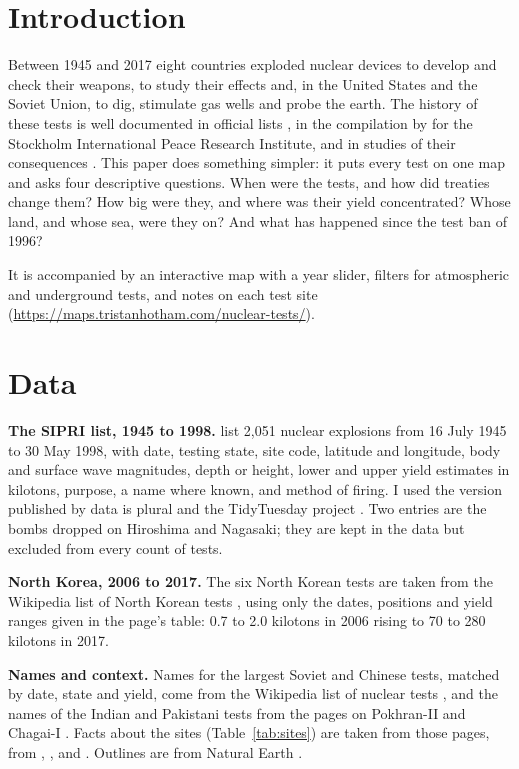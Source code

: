 \documentclass[11pt,a4paper]{article}
\begin{document}
\section{Introduction}
Between 1945 and 2017 eight countries exploded nuclear devices to develop and check their weapons, to study their effects and, in the United States and the Soviet Union, to dig, stimulate gas wells and probe the earth. The history of these tests is well documented in official lists \citep{doe,mikhailov}, in the compilation by \citet{sipri} for the Stockholm International Peace Research Institute, and in studies of their consequences \citep{unscear}. This paper does something simpler: it puts every test on one map and asks four descriptive questions. When were the tests, and how did treaties change them? How big were they, and where was their yield concentrated? Whose land, and whose sea, were they on? And what has happened since the test ban of 1996?

It is accompanied by an interactive map with a year slider, filters for atmospheric and underground tests, and notes on each test site (\url{https://maps.tristanhotham.com/nuclear-tests/}).

\section{Data}
\textbf{The SIPRI list, 1945 to 1998.} \citet{sipri} list 2,051 nuclear explosions from 16 July 1945 to 30 May 1998, with date, testing state, site code, latitude and longitude, body and surface wave magnitudes, depth or height, lower and upper yield estimates in kilotons, purpose, a name where known, and method of firing. I used the version published by data is plural and the TidyTuesday project \citep{tidytuesday}. Two entries are the bombs dropped on Hiroshima and Nagasaki; they are kept in the data but excluded from every count of tests.

\textbf{North Korea, 2006 to 2017.} The six North Korean tests are taken from the Wikipedia list of North Korean tests \citep{wikink}, using only the dates, positions and yield ranges given in the page's table: 0.7 to 2.0 kilotons in 2006 rising to 70 to 280 kilotons in 2017.

\textbf{Names and context.} Names for the largest Soviet and Chinese tests, matched by date, state and yield, come from the Wikipedia list of nuclear tests \citep{wikilist}, and the names of the Indian and Pakistani tests from the pages on Pokhran-II and Chagai-I \citep{wikipok,wikichagai}. Facts about the sites (Table~\ref{tab:sites}) are taken from those pages, from \citet{unscear}, \citet{royal}, \citet{khalturin} and \citet{kuletz}. Outlines are from Natural Earth \citep{naturalearth}.
\end{document}
